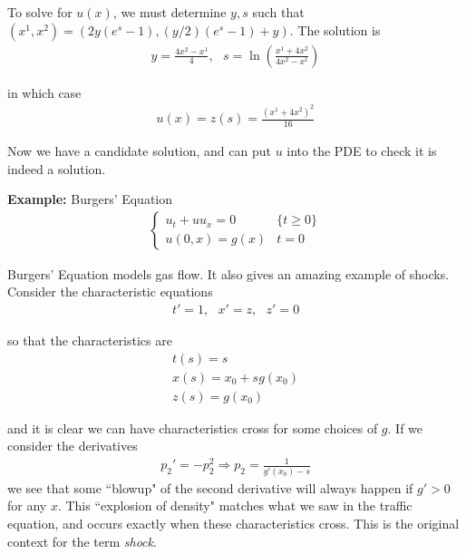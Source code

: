\documentclass{article}
\begin{document}
	To solve for $u(x)$, we must determine $y,s$ such that $(x^{1},x^{2}) = (2y(e^s-1), (y/2)(e^{s}-1)+y)$. The solution is 
	\begin{align*}
		y = \frac{4x^2 - x^1}{4}, \,\,\,\, s = \ln \left(\frac{x^{1}+4x^{2}}{4x^{2}-x^{1}}\right)
	\end{align*}
	
	in which case 
	\begin{align*}
		u(x) = z(s) = \frac{(x^1 + 4x^2)^{2}}{16}
	\end{align*}
	
	
	Now we have a candidate solution, and can put $u$ into the PDE to check it is indeed a solution. 
	
	\vspace{0.25 cm}
	
	\textbf{Example:} Burgers' Equation 
	\begin{align*}
		\begin{cases}
		u_{t} + u u_{x} = 0 &  \{ t \geq 0\} \\
		u(0,x) = g(x) & t=0	
		\end{cases}
	\end{align*} 
	
	Burgers' Equation models gas flow. It also gives an amazing example of shocks. Consider the characteristic equations 
	\begin{align*}
		t' = 1, \,\,\,\, x' = z, \,\,\,\, z' =0
	\end{align*}
	
	so that the characteristics are 
	\begin{align*}
		t(s) = s \\
		x(s) = x_0 + sg(x_0) \\
		z(s) = g(x_0)
	\end{align*}
	
	and it is clear we can have characteristics cross for some choices of $g$. If we consider the derivatives 
	\begin{align*}
		p_{2} '  = -p_{2}^{2} \Rightarrow 
		p_{2} = \frac{1}{g'(x_0) - s}
	\end{align*}
	we see that some ``blowup" of the second derivative will always happen if $g' > 0$ for any $x$. This ``explosion of density" matches what we saw in the traffic equation, and occurs exactly when these characteristics cross. This is the original context for the term \textit{shock}. 
	
	
	\vspace{0.25cm}
	
	
\end{document}
